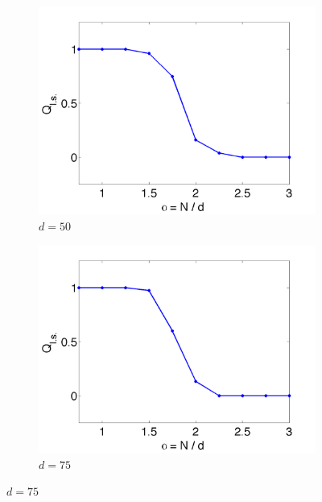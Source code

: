 \begin{figure}
	\centering
	\begin{subfigure}{0.48\textwidth}
		\centering
		\includegraphics[width=\textwidth]{./img/Ab_N50_nd75_nmax250}
		\caption{$d=50$}
		\label{fig:2:experiment:N50}
	\end{subfigure}
	\begin{subfigure}{0.48\textwidth}
		\centering
		\includegraphics[width=\textwidth]{./img/Ab_N75_nd75_nmax250}
		\caption{$d=75$}
		\label{fig:2:experiment:N75}
	\end{subfigure}


\end{figure}
